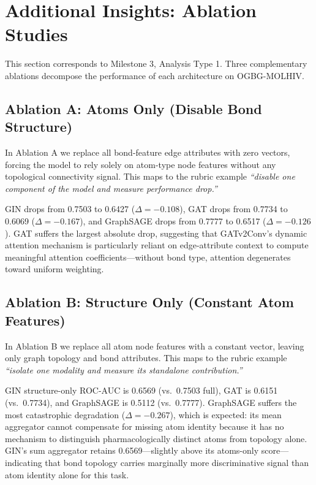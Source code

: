 
\section{Additional Insights: Ablation Studies}

This section corresponds to Milestone 3, Analysis Type 1. Three complementary ablations decompose the performance of each architecture on OGBG-MOLHIV.

\subsection{Ablation A: Atoms Only (Disable Bond Structure)}

In Ablation A we replace all bond-feature edge attributes with zero vectors, forcing the model to rely solely on atom-type node features without any topological connectivity signal. This maps to the rubric example \emph{``disable one component of the model and measure performance drop.''}

GIN drops from 0.7503 to 0.6427 ($\Delta = -0.108$), GAT drops from 0.7734 to 0.6069 ($\Delta = -0.167$), and GraphSAGE drops from 0.7777 to 0.6517 ($\Delta = -0.126$). GAT suffers the largest absolute drop, suggesting that GATv2Conv's dynamic attention mechanism is particularly reliant on edge-attribute context to compute meaningful attention coefficients---without bond type, attention degenerates toward uniform weighting.

\subsection{Ablation B: Structure Only (Constant Atom Features)}

In Ablation B we replace all atom node features with a constant vector, leaving only graph topology and bond attributes. This maps to the rubric example \emph{``isolate one modality and measure its standalone contribution.''}

GIN structure-only ROC-AUC is 0.6569 (vs.\ 0.7503 full), GAT is 0.6151 (vs.\ 0.7734), and GraphSAGE is 0.5112 (vs.\ 0.7777). GraphSAGE suffers the most catastrophic degradation ($\Delta = -0.267$), which is expected: its mean aggregator cannot compensate for missing atom identity because it has no mechanism to distinguish pharmacologically distinct atoms from topology alone. GIN's sum aggregator retains 0.6569---slightly above its atoms-only score---indicating that bond topology carries marginally more discriminative signal than atom identity alone for this task.

